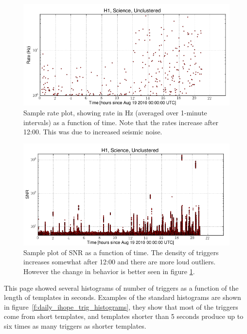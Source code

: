 \begin{figure}
  \includegraphics[width=\linewidth]{figures/detchar/H1_0_UNCLUSTERED_rate_vs_time.png}
  \caption[Daily ihope rate plot]{
  \label{f:daily_ihope_rate_v_time}
Sample rate plot, showing rate in Hz (averaged over
1-minute intervals) as a function of time.  Note that the rates
increase after 12:00.  This was due to increased seismic noise.}
\end{figure}%

\begin{figure}
  \includegraphics[width=\linewidth]{figures/detchar/H1_0_UNCLUSTERED_snr_vs_time.png}
  \caption[Daily ihope SNR plot as a function of time]{
  \label{f:daily_ihope_snr_v_time}
Sample plot of SNR as a function of time.  The density of
triggers increases somewhat after 12:00 and there are more loud
outliers.  However the change in behavior is better seen in 
figure \ref{f:daily_ihope_rate_v_time}.}
\end{figure}%



This page showed several histograms of number of triggers as a
function of the length of templates in seconds.  Examples of the
standard histograms are shown in
figure~\ref{f:daily_ihope_trig_histograms}, they show that most of the
triggers come from short templates, and templates shorter than 5
seconds produce up to six times as many triggers as shorter templates.

